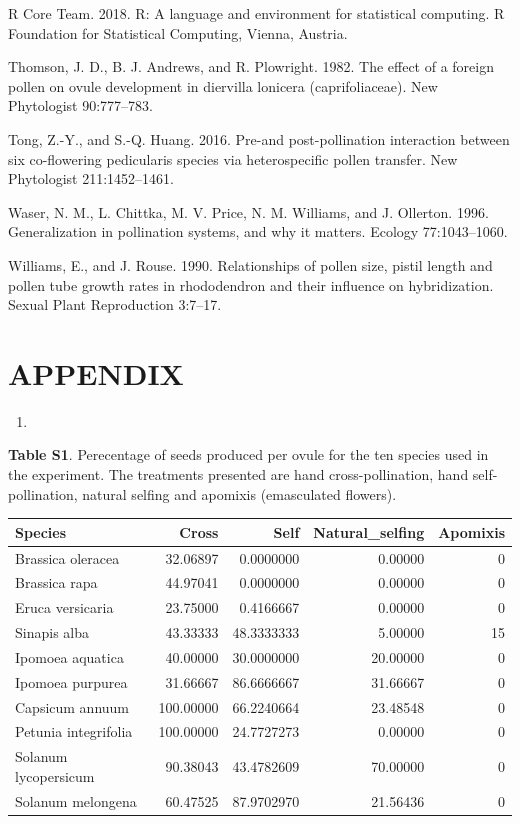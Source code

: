 \documentclass[11pt,a4paper]{article}
\begin{document}
\hypertarget{ref-R_Core_Team_2018}{}
R Core Team. 2018. R: A language and environment for statistical
computing. R Foundation for Statistical Computing, Vienna, Austria.

\hypertarget{ref-thomson1982}{}
Thomson, J. D., B. J. Andrews, and R. Plowright. 1982. The effect of a
foreign pollen on ovule development in diervilla lonicera
(caprifoliaceae). New Phytologist 90:777--783.

\hypertarget{ref-tong2016}{}
Tong, Z.-Y., and S.-Q. Huang. 2016. Pre-and post-pollination interaction
between six co-flowering pedicularis species via heterospecific pollen
transfer. New Phytologist 211:1452--1461.

\hypertarget{ref-waser1996}{}
Waser, N. M., L. Chittka, M. V. Price, N. M. Williams, and J. Ollerton.
1996. Generalization in pollination systems, and why it matters. Ecology
77:1043--1060.

\hypertarget{ref-williams1990}{}
Williams, E., and J. Rouse. 1990. Relationships of pollen size, pistil
length and pollen tube growth rates in rhododendron and their influence
on hybridization. Sexual Plant Reproduction 3:7--17.

\section{APPENDIX}\label{appendix}

\begin{enumerate}
\def\labelenumi{\arabic{enumi}.}
\item
\end{enumerate}

\textbf{Table S1}. Perecentage of seeds produced per ovule for the ten
species used in the experiment. The treatments presented are hand
cross-pollination, hand self-pollination, natural selfing and apomixis
(emasculated flowers).

\begin{longtable}[]{@{}lrrrr@{}}
\toprule
Species & Cross & Self & Natural\_selfing & Apomixis\tabularnewline
\midrule
\endhead
Brassica oleracea & 32.06897 & 0.0000000 & 0.00000 & 0\tabularnewline
Brassica rapa & 44.97041 & 0.0000000 & 0.00000 & 0\tabularnewline
Eruca versicaria & 23.75000 & 0.4166667 & 0.00000 & 0\tabularnewline
Sinapis alba & 43.33333 & 48.3333333 & 5.00000 & 15\tabularnewline
Ipomoea aquatica & 40.00000 & 30.0000000 & 20.00000 & 0\tabularnewline
Ipomoea purpurea & 31.66667 & 86.6666667 & 31.66667 & 0\tabularnewline
Capsicum annuum & 100.00000 & 66.2240664 & 23.48548 & 0\tabularnewline
Petunia integrifolia & 100.00000 & 24.7727273 & 0.00000 &
0\tabularnewline
Solanum lycopersicum & 90.38043 & 43.4782609 & 70.00000 &
0\tabularnewline
Solanum melongena & 60.47525 & 87.9702970 & 21.56436 & 0\tabularnewline
\bottomrule
\end{longtable}
\end{document}
